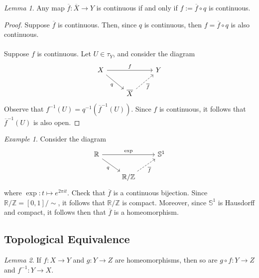 \documentclass[a4paper]{report}
\theoremstyle{definition}
\theoremstyle{remark}
\theoremstyle{proposition}
\theoremstyle{conjecture}
\theoremstyle{lemma}
\newtheorem{lemma}{Lemma}
\theoremstyle{corollary}
\theoremstyle{exercise}
\newtheorem{example}{Example}
\begin{document}
\begin{lemma}
    Any map $\overline{f} : \overline{X} \to Y$ is continuous
    if and only if $f := \overline{f} \circ q$ is continuous.
\end{lemma}

\begin{proof}
    Suppose $\overline{f}$ is continuous. Then, since $q$ is continuous,
    then $f = \overline{f} \circ q$ is also continuous. \\\\
    Suppose $f$ is continuous. Let $U \in \tau_Y$, and 
    consider the diagram 
    $$\begin{tikzcd}
X \arrow[rd, "q"'] \arrow[rr, "f"] &                                                  & Y \\
                                   & \overline{X} \arrow[ru, "\overline{f}"', dashed] &  
    \end{tikzcd}$$
    Observe that $f^{-1}(U) = q^{-1}(\overline{f}^{-1}(U))$. Since $f$ is continuous,
    it follows that $\overline{f}^{-1}(U)$ is also open.
\end{proof}

\begin{example}
    Consider the diagram
    $$\begin{tikzcd}
\mathbb{R} \arrow[rd, "q"'] \arrow[rr, "\exp"] &                                                           & \mathbb{S}^1 \\
                                               & \mathbb{R}/\mathbb{Z} \arrow[ru, "\overline{f}"', dashed] &             
    \end{tikzcd}$$
    where $\exp : t \mapsto e^{2\pi i t}$.
    Check that $\overline{f}$ is a continuous bijection.
    Since $\mathbb{R}/\mathbb{Z} = [0,1]/\sim$, it follows that 
    $\mathbb{R}/\mathbb{Z}$ is compact. Moreover, since $\mathbb{S}^1$
    is Hausdorff and compact, it follows then that $\overline{f}$
    is a homeomorphism.
\end{example}

\subsection{Topological Equivalence}

\begin{lemma}
    If $f : X \to Y$ and $g : Y \to Z$ are homeomorphisms, then 
    so are $g \circ f : Y \to Z$ and $f^{-1} : Y \to X$.
\end{lemma}
\end{document}
